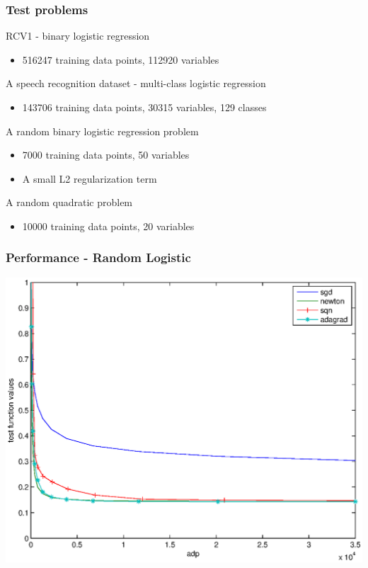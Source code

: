 \documentclass{beamer}
\begin{document}
\begin{frame}
	\frametitle{Test problems}
	RCV1 - binary logistic regression
	\begin{itemize}
		\item 516247 training data points, 112920 variables
	\end{itemize}
	\pause
	A speech recognition dataset - multi-class logistic regression
	\begin{itemize}
		\item 143706 training data points, 30315 variables, 129 classes
	\end{itemize}
	\pause
	A random binary logistic regression problem
	\begin{itemize}
		\item 7000 training data points, 50 variables
		\item A small L2 regularization term 
	\end{itemize}
	\pause
	A random quadratic problem
	\begin{itemize}
		\item 10000 training data points, 20 variables
	\end{itemize}
\end{frame}

\begin{frame}
	\frametitle{Performance - Random Logistic}
	\begin{center}
	\includegraphics[scale=0.4]{figures/P04.eps}
	\end{center}
\end{frame}
\end{document}
